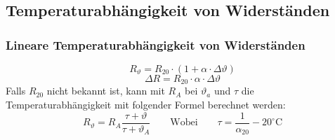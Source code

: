 



\subsection{Temperaturabhängigkeit von Widerständen}

\subsubsection{Lineare Temperaturabhängigkeit von Widerständen}
\[ R_\vartheta = R_{20} \cdot (1 + \alpha \cdot \Delta \vartheta) \]
\[ \Delta R = R_{20} \cdot \alpha \cdot \Delta \vartheta \]
Falls $R_{20}$ nicht bekannt ist, kann mit $R_A$ bei $\vartheta_a$ und $\tau$ 
die Temperaturabhängigkeit mit folgender Formel berechnet werden:  
\[ R_\vartheta = R_A \frac{\tau + \vartheta}{\tau + \vartheta_A} 
\qquad \text{Wobei} 
\qquad \tau = \frac{1}{\alpha_20} - 20^{\circ}\text{C} \]

